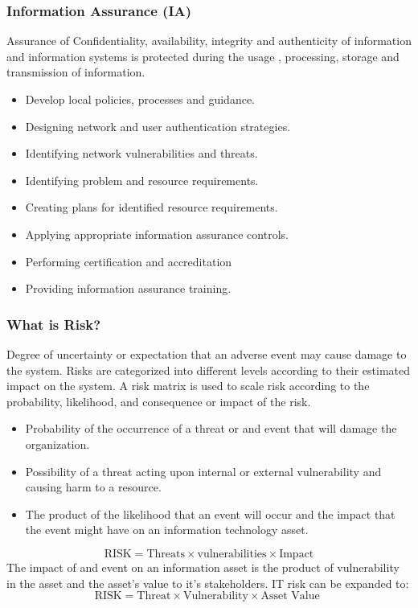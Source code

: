 \subsubsection{Information Assurance (IA)}
Assurance of Confidentiality, availability, integrity and authenticity of information and information systems is protected during the usage , processing, storage and transmission of information.
\begin{itemize}
    \item Develop local policies, processes and guidance.
    \item Designing network and user authentication strategies.
    \item Identifying network vulnerabilities and threats.
    \item Identifying problem and resource requirements.
    \item Creating plans for identified resource requirements.
    \item Applying appropriate information assurance controls.
    \item Performing certification and accreditation
    \item Providing information assurance training.
\end{itemize}

\subsubsection{What is Risk?}
Degree of uncertainty or expectation that an adverse event may cause damage to the system.
Risks are categorized into  different levels according to their estimated impact on the system.
A risk matrix is used to scale risk according to the probability, likelihood, and consequence or impact of the risk. 
\begin{itemize}
    \item Probability of the occurrence of a threat or and event that will damage the organization.
    \item Possibility of a threat acting upon internal or external vulnerability and causing harm to a resource.
    \item The product of the likelihood that an event will occur and the impact that the event might have on an information technology asset.
\end{itemize}
\begin{equation*}
    \text{RISK} = \text{Threats} \times \text{vulnerabilities} \times \text{Impact}
\end{equation*}
The impact of and event on an information asset is the product of vulnerability in the asset and the asset's value to it's stakeholders.
IT risk can be expanded to:
\begin{equation*}
    \text{RISK} = \text{Threat} \times \text{Vulnerability} \times \text{Asset Value }
\end{equation*}

